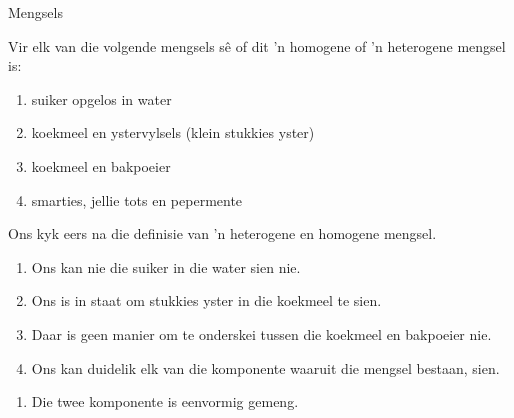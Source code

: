 \vspace{-2cm}
\label{m38708*eip-479}
      \begin{wex}{Mengsels}
{Vir elk van die volgende mengsels sê of dit 'n homogene of 'n heterogene mengsel is:
\label{m38708*eip-id1167649056231}\begin{enumerate}[noitemsep, label=\textbf{\alph*}. ] 
            \leftskip=20pt\rightskip=\leftskip\item suiker opgelos in water
\item koekmeel en ystervylsels (klein stukkies yster)
\item koekmeel en bakpoeier
\item smarties, jellie tots en pepermente\end{enumerate} }
{
Ons kyk eers na die definisie van 'n heterogene en homogene mengsel.
\begin{enumerate}[noitemsep, label=\textbf{\alph*}. ] 
\item Ons kan nie die suiker in die water sien nie.
\item Ons is in staat om stukkies yster in die koekmeel te sien.
\item Daar is geen manier om te onderskei tussen die koekmeel en bakpoeier nie.
\item Ons kan duidelik elk van die komponente waaruit die mengsel bestaan, sien. \end{enumerate}
\begin{enumerate}[noitemsep, label=\textbf{\alph*}. ] 
\item Die twee komponente is eenvormig gemeng.

\end{enumerate}}
\end{wex}
